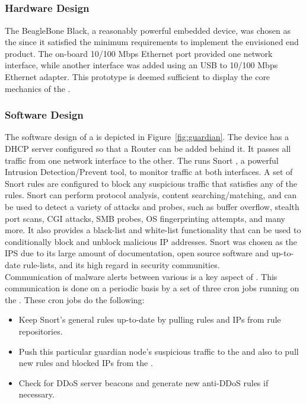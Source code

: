 \subsection{\nodename}
\label{sec:design:guardian}

\subsubsection{Hardware Design}
The BeagleBone Black, a reasonably powerful embedded device, was chosen as the \nodename since it satisfied the minimum requirements to implement the envisioned end product. The on-board 10/100 Mbps Ethernet port provided one network interface, while another interface was added using an USB to 10/100 Mbps Ethernet adapter. This prototype is deemed sufficient to display the core mechanics of the \nodename. 

\subsubsection{Software Design}
\label{sec:design:software}

The software design of a \nodename is depicted in Figure~\ref{fig:guardian}. The device has a DHCP server configured so that a Router can be added behind it. It passes all traffic from one network interface to the other. The \nodename runs Snort \cite{Roesch:1999:SLI:1039834.1039864}, a powerful Intrusion Detection/Prevent tool, to monitor traffic at both interfaces. A set of Snort rules are configured to block any suspicious traffic that satisfies any of the rules. Snort can perform protocol analysis, content searching/matching, and can be used to detect a variety of attacks and probes, such as buffer overflow, stealth port scans, CGI attacks, SMB probes, OS fingerprinting attempts, and many more. It also provides a black-list and white-list functionality that can be used to conditionally block and unblock malicious IP addresses. Snort was chosen as the IPS due to its large amount of documentation, open source software and up-to-date rule-lists, and its high regard in security communities. \\

Communication of malware alerts between various \nodenames is a key aspect of \sysname. This communication is done on a periodic basis by a set of three cron jobs running on the \nodename. These cron jobs do the following:

\begin{itemize}
    \item Keep Snort's general rules up-to-date by pulling rules and IPs from rule repositories.
    \item Push this particular guardian node's suspicious traffic to the \servname and also to pull new rules and blocked IPs from the \servname.
    \item Check for DDoS server beacons and generate new anti-DDoS rules if necessary.
\end{itemize}

